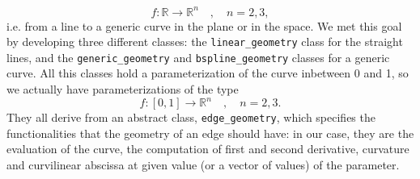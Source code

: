 \documentclass[11pt]{article} %
\newcommand{\classname}[1]{\texttt{#1}}
\begin{document}
		\begin{equation*}
			f:\mathbb{R}\rightarrow\mathbb{R}^{n} \quad, \quad n=2,3 ,
		\end{equation*}
		i.e. from a line to a generic curve in the plane or in the space. We met this goal by developing three different classes: the \classname{linear\_geometry} class for the straight lines, and the \classname{generic\_geometry} and \classname{bspline\_geometry} classes for a generic curve.\newline
		All this classes hold a parameterization of the curve inbetween 0 and 1, so we actually have parameterizations of the type
		\begin{equation*}
			f:[0,1]\rightarrow\mathbb{R}^{n} \quad, \quad n=2,3.
		\end{equation*}
		They all derive from an abstract class, \classname{edge\_geometry}, which specifies the functionalities that the geometry of an edge should have: in our case, they are the evaluation of the curve, the computation of first and second derivative, curvature and curvilinear abscissa at given value (or a vector of values) of the parameter.
		
		
		
\end{document}
